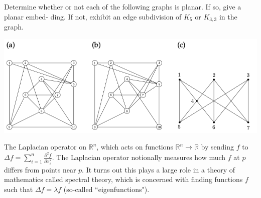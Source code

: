\begin{enumerate}
    
     Determine whether or not each of the following graphs is planar. If so, give a planar embed- ding. If not, exhibit an edge subdivision of $K_5$ or $K_{3,3}$ in the graph.
    \begin{center}
    \includegraphics[scale=0.4]{t10q4drawings.png}
    \end{center}
    
    
    The Laplacian operator on $\mathbb{R}^n$, which acts on functions $\mathbb{R}^n \to \mathbb{R}$ by sending $f$ to $\Delta f = \sum_{i = 1}^n \frac{\partial^2 f}{\partial x_i^2}$. The Laplacian operator notionally measures how much $f$ at $p$ differs from points near $p$. It turns out this plays a large role in a theory of mathematics called spectral theory, which is concerned with finding functions $f$ such that $\Delta f = \lambda f$ (so-called ``eigenfunctions").


\end{enumerate}
